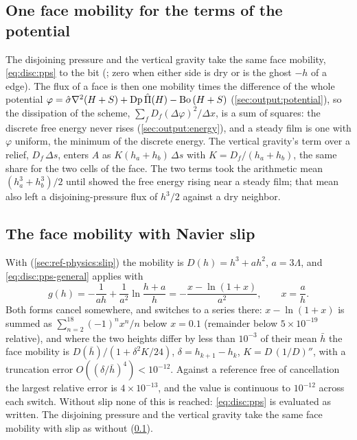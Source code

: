 \subsection{One face mobility for the terms of the potential}
\label{sec:disc:positivity-one}

The disjoining pressure and the vertical gravity take the same face mobility,
\cref{eq:disc:pps} to the bit (; zero when either side is
dry or is the ghost $-h$ of a  edge). The flux of a face is
then one mobility times the difference of the whole potential
$\varphi = \hat\sigma\nabla^2(H+S) + \mathrm{Dp}\,\hat{\Pi}(H) - \mathrm{Bo}\,(H+S)$
(\cref{sec:output:potential}), so the dissipation of the scheme,
$\sum_f D_f(\Delta\varphi)^2/\Delta x$, is a sum of squares: the discrete free
energy never rises (\cref{sec:output:energy}), and a steady film is one with
$\varphi$ uniform, the minimum of the discrete energy. The vertical gravity's
term over a relief, $D_f\,\Delta s$, enters $A$ as $K(h_a + h_b)\,\Delta s$
with $K = D_f/(h_a + h_b)$, the same share for the two cells of the face. The
two terms took the arithmetic mean $(h_a^3 + h_b^3)/2$ until 
showed the free energy rising near a steady film; that mean also left a
disjoining-pressure flux of $h^3/2$ against a dry neighbor.

\subsection{The face mobility with Navier slip}
\label{sec:disc:positivity-slip}

With  (\cref{sec:ref-physics:slip}) the mobility is
$D(h) = h^{3} + a h^{2}$, $a = 3\Lambda$, and \cref{eq:disc:pps-general}
applies with
%
\begin{equation}
  g(h) = -\frac{1}{a h} + \frac{1}{a^{2}}\ln\frac{h+a}{h}
       = -\frac{x - \ln(1+x)}{a^{2}}, \qquad x = \frac{a}{h} .
  \label{eq:disc:pps-slip}
\end{equation}
%
Both forms cancel somewhere, and  switches to a series
there: $x - \ln(1+x)$ is summed as $\sum_{n=2}^{18}(-1)^n x^n/n$ below
$x = 0.1$ (remainder below $5\times10^{-19}$ relative), and where the two
heights differ by less than $10^{-3}$ of their mean $\bar h$ the face mobility
is $D(\bar h)/(1 + \delta^{2}K/24)$, $\delta = h_{k+1} - h_k$,
$K = D\,(1/D)''$, with a truncation error $O((\delta/\bar h)^4) < 10^{-12}$.
Against a reference free of cancellation the largest relative error is
$4\times10^{-13}$, and the value is continuous to $10^{-12}$ across each switch.
Without slip none of this is reached: \cref{eq:disc:pps} is
evaluated as written. The disjoining pressure and the vertical gravity take
the same face mobility with slip as without (\cref{sec:disc:positivity-one}).

